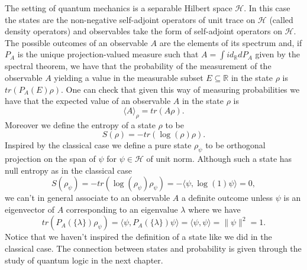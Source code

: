 The setting of quantum mechanics is a separable Hilbert space $\mathcal{H}$. In this case the states are the non-negative self-adjoint operators of unit trace on $\mathcal{H}$ (called density operators) and observables take the form of self-adjoint operators on $\mathcal{H}$. The possible outcomes of an observable $A$ are the elements of its spectrum and, if $P_A$ is the unique projection-valued measure such that $A=\int id_\mathbb{R}dP_A$ given by the spectral theorem, we have that the probability of the measurement of the observable $A$ yielding a value in the measurable subset $E\subseteq\mathbb{R}$ in the state $\rho$ is $tr(P_A(E)\rho)$. One can check that given this way of measuring probabilities we have that the expected value of an observable $A$ in the state $\rho$ is
\begin{equation}\label{eq:quantum_states}
\langle A\rangle_\rho = tr(A\rho).
\end{equation}
Moreover we define the entropy of a state $\rho$ to be
\begin{equation}\label{eq:Q_entropy}
S(\rho)=-tr(\log(\rho)\rho).
\end{equation}
Inspired by the classical case we define a pure state $\rho_\psi$ to be orthogonal projection on the span of $\psi$ for $\psi\in\mathcal{H}$ of unit norm. Although such a state has null entropy as in the classical case
\begin{equation}
S(\rho_\psi)=-tr(\log(\rho_\psi)\rho_\psi)=-\langle\psi,\log(1)\psi\rangle = 0,
\end{equation} 
we can't in general associate to an observable $A$ a definite outcome unless $\psi$ is an eigenvector of $A$ corresponding to an eigenvalue $\lambda$ where we have 
\begin{equation}
tr(P_A(\{\lambda\})\rho_\psi)=\langle\psi,P_A(\{\lambda\})\psi\rangle=\langle\psi,\psi\rangle=\|\psi\|^2=1. 
\end{equation}
Notice that we haven't inspired the definition of a state like we did in the classical case. The connection between states and probability is given through the study of quantum logic in the next chapter.
